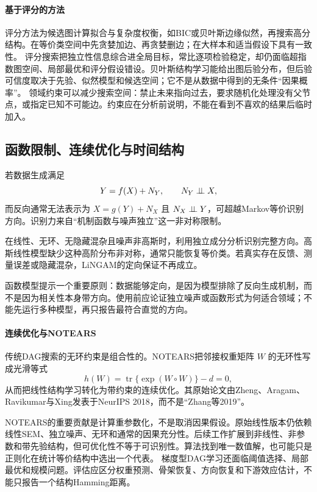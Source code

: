 \paragraph{基于评分的方法}

评分方法为候选图计算拟合与复杂度权衡，如BIC或贝叶斯边缘似然，再搜索高分结构。在等价类空间中先贪婪加边、再贪婪删边；在大样本和适当假设下具有一致性\parencite{chickering2002}。
评分搜索把独立性信息综合进全局目标，常比逐项检验稳定，却仍面临超指数图空间、局部最优和评分假设错设。贝叶斯结构学习能给出图后验分布，但后验可信度取决于先验、似然模型和候选空间；它不是从数据中得到的无条件“因果概率”。
领域约束可以减少搜索空间：禁止未来指向过去，要求随机化处理没有父节点，或指定已知不可能边。约束应在分析前说明，不能在看到不喜欢的结果后临时加入。

\subsection{函数限制、连续优化与时间结构}

若数据生成满足
\[
Y=f(X)+N_Y,\qquad N_Y\mathrel{\perp\!\!\!\perp} X,
\]
而反向通常无法表示为 $X=g(Y)+N_X$ 且 $N_X\mathrel{\perp\!\!\!\perp} Y$，可超越Markov等价识别方向\parencite{hoyer2009}。识别力来自“机制函数与噪声独立”这一非对称限制。

在线性、无环、无隐藏混杂且噪声非高斯时，利用独立成分分析识别完整方向\parencite{shimizu2006}。高斯线性模型缺少这种高阶分布非对称，通常只能恢复等价类。若真实存在反馈、测量误差或隐藏混杂，LiNGAM的定向保证不再成立。

函数模型提示一个重要原则：数据能够定向，是因为模型排除了反向生成机制，而不是因为相关性本身带方向。使用前应论证独立噪声或函数形式为何适合领域；不能先运行多种模型，再只报告最符合直觉的方向。

\paragraph{连续优化与NOTEARS}

传统DAG搜索的无环约束是组合性的。NOTEARS把邻接权重矩阵 $W$ 的无环性写成光滑等式
\[
h(W)=\operatorname{tr}\{\exp(W\circ W)\}-d=0,
\]
从而把线性结构学习转化为带约束的连续优化\parencite{zheng2018}。其原始论文由Zheng、Aragam、Ravikumar与Xing发表于NeurIPS 2018，而不是“Zhang等2019”。

NOTEARS的重要贡献是计算重参数化，不是取消因果假设。原始线性版本仍依赖线性SEM、独立噪声、无环和通常的因果充分性。后续工作扩展到非线性、非参数和带先验结构，但可优化性不等于可识别性。算法找到唯一数值解，也可能只是正则化在统计等价结构中选出一个代表。
梯度型DAG学习还面临阈值选择、局部最优和规模问题。评估应区分权重预测、骨架恢复、方向恢复和下游效应估计，不能只报告一个结构Hamming距离。

